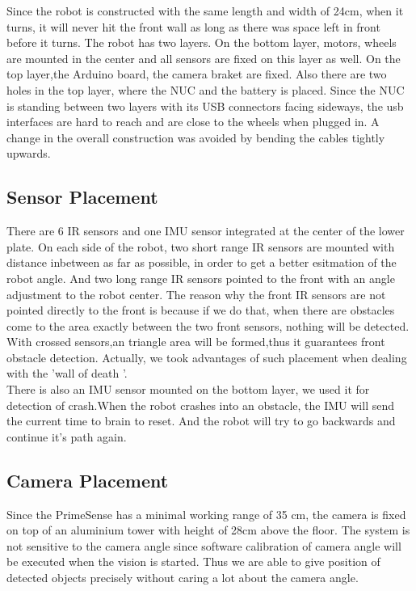 \setlength{\parindent}{0pt}Since the robot is constructed with the same length and width of 24cm, when it turns, it will never hit the front wall as long as there was space left in front before it turns.
The robot has two layers. On the bottom layer, motors, wheels are mounted in the center and all sensors are fixed on this layer as well.
On the top layer,the Arduino board, the camera braket are fixed.
Also there are two holes in the top layer, where the NUC and the battery is placed.
Since the NUC is standing between two layers with its USB connectors facing sideways, the usb interfaces are hard to reach and are close to the wheels when plugged in.
A change in the overall construction was avoided by bending the cables tightly upwards.

\subsection{Sensor Placement}
There are 6 IR sensors and one IMU sensor integrated at the center of the lower plate.
On each side of the robot, two short range IR sensors are mounted with distance inbetween as far as possible, in order to get a better esitmation of the robot angle. 
And two long range IR sensors pointed to the front with an angle adjustment to the robot center.  
The reason why the front IR sensors are not pointed directly to the front is because if we do that, when there are obstacles come to the area exactly between the two front sensors, nothing will be detected.
With crossed sensors,an triangle area will be formed,thus it guarantees front obstacle detection.
Actually, we took advantages of such placement when dealing with the 'wall of death '.\\

\setlength{\parindent}{0pt}There is also an IMU sensor mounted on the bottom layer, we used it for detection of crash.When the robot crashes into an obstacle, the IMU will send the current time to brain to reset.
And the robot will try to go backwards and continue it's path again.

\subsection{Camera Placement}
Since the PrimeSense has a minimal working range of 35 cm, the camera is fixed on top of an aluminium tower with height of 28cm above the floor. 
The system is not sensitive to the camera angle since software calibration of camera angle will be executed when the vision is started.
Thus we are able to give position of detected objects precisely without caring a lot about the camera angle.